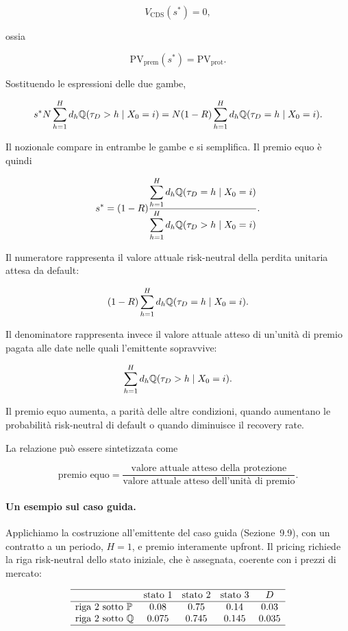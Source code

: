\[
V_{\mathrm{CDS}}(s^{*})=0,
\]

ossia

\[
\mathrm{PV}_{\mathrm{prem}}(s^{*})
=
\mathrm{PV}_{\mathrm{prot}}.
\]

Sostituendo le espressioni delle due gambe,

\[
s^{*}N
\sum_{h=1}^{H}
d_h
\mathbb{Q}(\tau_D>h\mid X_0=i)
=
N(1-R)
\sum_{h=1}^{H}
d_h
\mathbb{Q}(\tau_D=h\mid X_0=i).
\]

Il nozionale compare in entrambe le gambe e si semplifica. Il premio
equo \`{e} quindi

\[
s^{*}
=
(1-R)
\frac{
\displaystyle
\sum_{h=1}^{H}
d_h
\mathbb{Q}(\tau_D=h\mid X_0=i)
}{
\displaystyle
\sum_{h=1}^{H}
d_h
\mathbb{Q}(\tau_D>h\mid X_0=i)
}.
\]

Il numeratore rappresenta il valore attuale risk-neutral della perdita
unitaria attesa da default:

\[
(1-R)
\sum_{h=1}^{H}
d_h
\mathbb{Q}(\tau_D=h\mid X_0=i).
\]

Il denominatore rappresenta invece il valore attuale atteso di
un'unit\`{a} di premio pagata alle date nelle quali l'emittente
sopravvive:

\[
\sum_{h=1}^{H}
d_h
\mathbb{Q}(\tau_D>h\mid X_0=i).
\]

Il premio equo aumenta, a parit\`{a} delle altre condizioni, quando
aumentano le probabilit\`{a} risk-neutral di default o quando
diminuisce il recovery rate.

La relazione pu\`{o} essere sintetizzata come

\[
\boxed{
\text{premio equo}
=
\frac{
\text{valore attuale atteso della protezione}
}{
\text{valore attuale atteso dell'unit\`{a} di premio}
}.
}
\]

\paragraph{Un esempio sul caso guida.}

Applichiamo la costruzione all'emittente del caso guida
(Sezione~9.9), con un contratto a un periodo, $H=1$, e premio
interamente upfront. Il pricing richiede la riga risk-neutral dello
stato iniziale, che \`{e} assegnata, coerente con i prezzi di mercato:

\[
\begin{array}{lcccc}
\hline
& \text{stato }1 & \text{stato }2 & \text{stato }3 & D\\
\hline
\text{riga 2 sotto }\mathbb{P} & 0.08 & 0.75 & 0.14 & 0.03\\
\text{riga 2 sotto }\mathbb{Q} & 0.075 & 0.745 & 0.145 & 0.035\\
\hline
\end{array}
\]

